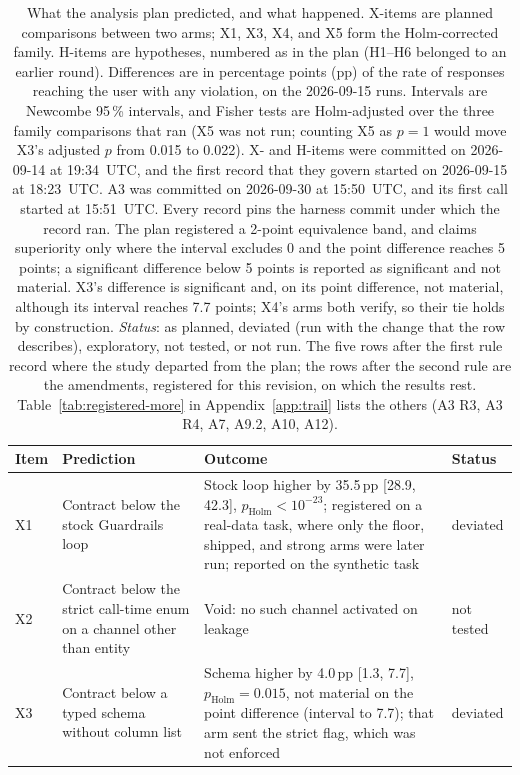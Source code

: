 \documentclass[10pt,twocolumn]{article}
\begin{document}
\begin{table}[!tp]
\caption{What the analysis plan predicted, and what happened. X-items are
planned comparisons between two arms; X1, X3, X4, and X5 form the
Holm-corrected family. H-items are hypotheses, numbered as in the plan (H1--H6
belonged to an earlier round). Differences are in percentage points (pp) of
the rate of responses reaching the user with any violation, on the 2026-09-15
runs. Intervals are Newcombe 95\,\% intervals, and Fisher tests are
Holm-adjusted over the three family comparisons that ran (X5 was not run;
counting X5 as $p=1$ would move X3's adjusted $p$ from 0.015 to 0.022). X- and H-items were committed on
2026-09-14 at 19:34~UTC, and the first record that they govern started on
2026-09-15 at 18:23~UTC. A3 was committed on 2026-09-30 at 15:50~UTC, and its
first call started at 15:51~UTC. Every record pins the harness commit under
which the record ran. The plan registered a 2-point equivalence band, and
claims superiority only where the interval excludes 0 and the point difference
reaches 5 points; a significant difference below 5 points is reported as
significant and not material. X3's difference is significant and, on its point
difference, not material, although its interval reaches 7.7 points; X4's arms
both verify, so their tie holds by construction. \emph{Status}: as planned, deviated (run
with the change that the row describes), exploratory, not tested, or not run.
The five rows after the first rule record where the study departed from the
plan; the rows after the second rule are the amendments, registered for this
revision, on which the results rest. Table~\ref{tab:registered-more} in
Appendix~\ref{app:trail} lists the others (A3 R3, A3 R4, A7, A9.2, A10,
A12).}
\label{tab:registered}
\centering
\footnotesize
\setlength{\tabcolsep}{2.4pt}
\begin{tabular}{@{}lp{5.4cm}p{8.9cm}l@{}}
\toprule
Item & Prediction & Outcome & Status \\
\midrule
X1 & Contract below the stock Guardrails loop & Stock loop higher by 35.5\,pp [28.9, 42.3], $p_{\mathrm{Holm}}<10^{-23}$; registered on a real-data task, where only the floor, shipped, and strong arms were later run; reported on the synthetic task & deviated \\
X2 & Contract below the strict call-time enum on a channel other than entity & Void: no such channel activated on leakage & not tested \\
X3 & Contract below a typed schema without column list & Schema higher by 4.0\,pp [1.3, 7.7], $p_{\mathrm{Holm}}=0.015$, not material on the point difference (interval to 7.7); that arm sent the strict flag, which was not enforced & deviated \\

\end{tabular}
\end{table}
\end{document}

